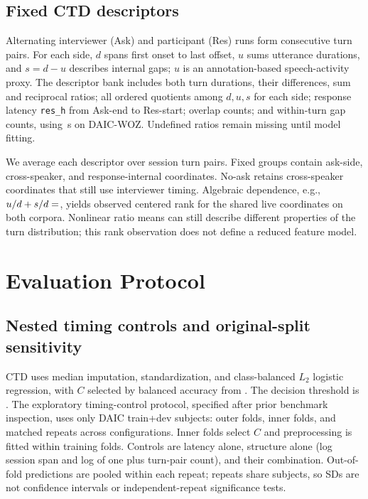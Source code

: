 \documentclass{article}
\begin{document}
\subsection{Fixed CTD descriptors}
Alternating interviewer (Ask) and participant (Res) runs form consecutive turn pairs. For each side, $d$ spans first onset to last offset, $u$ sums utterance durations, and $s=d-u$ describes internal gaps; $u$ is an annotation-based speech-activity proxy. The descriptor bank includes both turn durations, their differences, sum and reciprocal ratios; all ordered quotients among $d,u,s$ for each side; response latency \texttt{res\_h} from Ask-end to Res-start; overlap counts; and within-turn gap counts, using \,s on DAIC-WOZ. Undefined ratios remain missing until model fitting.

We average each descriptor over session turn pairs. Fixed groups contain  ask-side,  cross-speaker, and  response-internal coordinates. No-ask retains cross-speaker coordinates that still use interviewer timing. Algebraic dependence, e.g., $u/d+s/d=\R{unitSum}$, yields observed centered rank  for the  shared live coordinates on both corpora. Nonlinear ratio means can still describe different properties of the turn distribution; this rank observation does not define a reduced feature model.

\section{Evaluation Protocol}
\subsection{Nested timing controls and original-split sensitivity}
CTD uses median imputation, standardization, and class-balanced $L_2$ logistic regression, with $C$ selected by balanced accuracy from . The decision threshold is . The exploratory timing-control protocol, specified after prior benchmark inspection, uses only  DAIC train+dev subjects:  outer folds,  inner folds, and  matched repeats across configurations. Inner folds select $C$ and preprocessing is fitted within training folds. Controls are latency alone, structure alone (log session span and log of one plus turn-pair count), and their combination. Out-of-fold predictions are pooled within each repeat; repeats share subjects, so SDs are not confidence intervals or independent-repeat significance tests.
\end{document}

